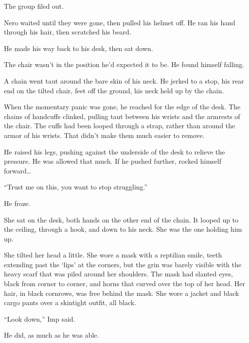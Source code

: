 The group filed out.



Nero waited until they were gone, then pulled his helmet off.  He ran his hand through his hair, then scratched his beard.



He made his way back to his desk, then sat down.



The chair wasn't in the position he'd expected it to be.  He found himself falling.



A chain went taut around the bare skin of his neck.  He jerked to a stop, his rear end on the tilted chair, feet off the ground, his neck held up by the chain.



When the momentary panic was gone, he reached for the edge of the desk.  The chains of handcuffs clinked, pulling taut between his wrists and the armrests of the chair. The cuffs had been looped through a strap, rather than around the armor of his wrists.  That didn't make them much easier to remove.



He raised his legs, pushing against the underside of the desk to relieve the pressure.  He was allowed that much.  If he pushed further, rocked himself forward\ldots



``Trust me on this, you want to stop struggling.''



He froze.



She sat on the desk, both hands on the other end of the chain.  It looped up to the ceiling, through a hook, and down to his neck.  She was the one holding him up.



She tilted her head a little.  She wore a mask with a reptilian smile, teeth extending past the `lips' at the corners, but the grin was barely visible with the heavy scarf that was piled around her shoulders.  The mask had slanted eyes, black from corner to corner, and horns that curved over the top of her head.  Her hair, in black cornrows, was free behind the mask.  She wore a jacket and black cargo pants over a skintight outfit, all black.



``Look down,'' Imp said.



He did, as much as he was able.



